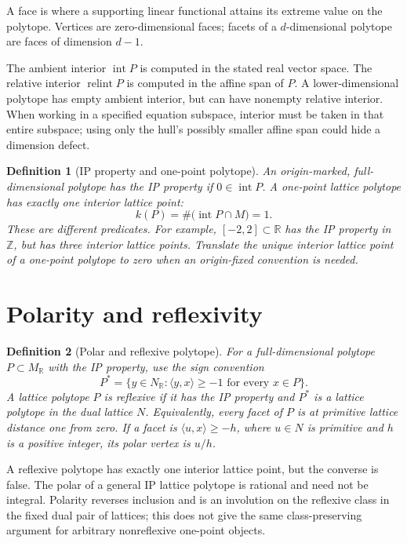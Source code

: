 \documentclass[11pt,a4paper,oneside]{report}
\newtheorem{definition}{Definition}[chapter]
\begin{document}
A face is where a supporting linear functional attains its extreme value
on the polytope. Vertices are zero-dimensional faces; facets of a
\(d\)-dimensional polytope are faces of dimension \(d-1\).

The ambient interior \(\operatorname{int}P\) is computed in the stated real
vector space. The relative interior \(\operatorname{relint}P\) is computed
in the affine span of \(P\). A lower-dimensional polytope has empty ambient
interior, but can have nonempty relative interior. When working in a specified
equation subspace, interior must be taken in that entire subspace; using only
the hull's possibly smaller affine span could hide a dimension defect.

\begin{definition}[IP property and one-point polytope]
An origin-marked, full-dimensional polytope has the \emph{IP property} if
\(0\in\operatorname{int}P\). A \emph{one-point lattice polytope} has exactly
one interior lattice point:
\[
  k(P)=\#\bigl(\operatorname{int}P\cap M\bigr)=1.
\]
These are different predicates. For example, \([-2,2]\subset\mathbb{R}\)
has the IP property in \(\mathbb{Z}\), but has three interior lattice points.
Translate the unique interior lattice point of a one-point polytope to zero
when an origin-fixed convention is needed.
\end{definition}

\section{Polarity and reflexivity}

\begin{definition}[Polar and reflexive polytope]
For a full-dimensional polytope \(P\subset M_{\mathbb{R}}\) with the IP
property, use the sign convention
\[
  P^{*}=\{y\in N_{\mathbb{R}}:
    \langle y,x\rangle\geq -1\text{ for every }x\in P\}.
\]
A lattice polytope \(P\) is \emph{reflexive} if it has the IP property and
\(P^{*}\) is a lattice polytope in the dual lattice \(N\).
Equivalently, every facet of \(P\) is at primitive lattice distance one from
zero. If a facet is \(\langle u,x\rangle\geq-h\), where \(u\in N\) is
primitive and \(h\) is a positive integer, its polar vertex is \(u/h\).
\end{definition}

A reflexive polytope has exactly one interior lattice point, but the converse
is false. The polar of a general IP lattice polytope is rational and need
not be integral. Polarity reverses inclusion and is an involution on the
reflexive class in the fixed dual pair of lattices; this does not give the
same class-preserving argument for arbitrary nonreflexive one-point objects.
\end{document}
